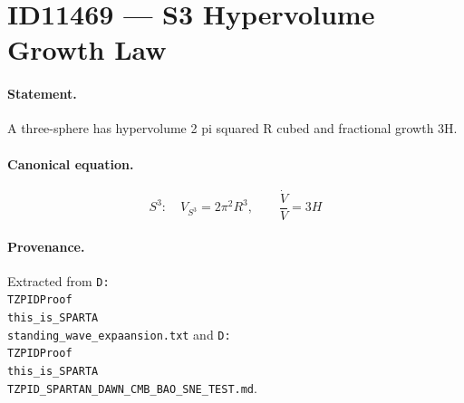 \section*{ID11469 --- S3 Hypervolume Growth Law}

\paragraph{Statement.}
A three-sphere has hypervolume 2 pi squared R cubed and fractional growth 3H.

\paragraph{Canonical equation.}
\[
S^3:\quad V_{S^3}=2\pi^2R^3,\qquad\frac{\dot V}{V}=3H
\]

\paragraph{Provenance.}
Extracted from \texttt{D:\\TZPIDProof\\this\_is\_SPARTA\\standing\_wave\_expaansion.txt} and \texttt{D:\\TZPIDProof\\this\_is\_SPARTA\\TZPID\_SPARTAN\_DAWN\_CMB\_BAO\_SNE\_TEST.md}.
